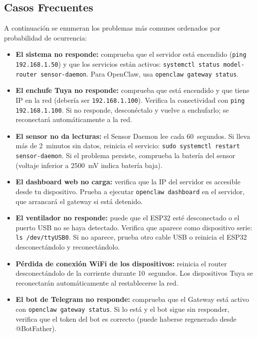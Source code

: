 \subsection{Casos Frecuentes}

A continuación se enumeran los problemas más comunes ordenados por probabilidad de ocurrencia:

\begin{itemize}
    \item \textbf{El sistema no responde:} comprueba que el servidor está encendido (\texttt{ping 192.168.1.50}) y que los servicios están activos: \texttt{systemctl status model-router sensor-daemon}. Para OpenClaw, usa \texttt{openclaw gateway status}.

    \item \textbf{El enchufe Tuya no responde:} comprueba que está encendido y que tiene IP en la red (debería ser \texttt{192.168.1.100}). Verifica la conectividad con \texttt{ping 192.168.1.100}. Si no responde, desconéctalo y vuelve a enchufarlo; se reconectará automáticamente a la red.

    \item \textbf{El sensor no da lecturas:} el Sensor Daemon lee cada 60~segundos. Si lleva más de 2~minutos sin datos, reinicia el servicio: \texttt{sudo systemctl restart sensor-daemon}. Si el problema persiste, comprueba la batería del sensor (voltaje inferior a 2500~mV indica batería baja).

    \item \textbf{El dashboard web no carga:} verifica que la IP del servidor es accesible desde tu dispositivo. Prueba a ejecutar \texttt{openclaw dashboard} en el servidor, que arrancará el gateway si está detenido.

    \item \textbf{El ventilador no responde:} puede que el ESP32 esté desconectado o el puerto USB no se haya detectado. Verifica que aparece como dispositivo serie: \texttt{ls /dev/ttyUSB0}. Si no aparece, prueba otro cable USB o reinicia el ESP32 desconectándolo y reconectándolo.

    \item \textbf{Pérdida de conexión WiFi de los dispositivos:} reinicia el router desconectándolo de la corriente durante 10~segundos. Los dispositivos Tuya se reconectarán automáticamente al restablecerse la red.

    \item \textbf{El bot de Telegram no responde:} comprueba que el Gateway está activo con \texttt{openclaw gateway status}. Si lo está y el bot sigue sin responder, verifica que el token del bot es correcto (puede haberse regenerado desde @BotFather).


\end{itemize}
